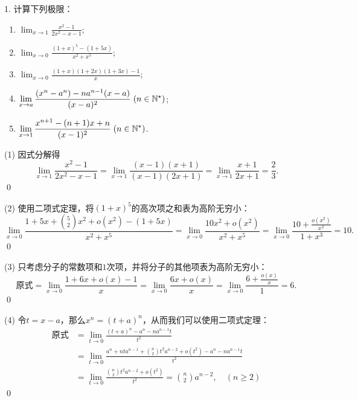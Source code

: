 \exercise

1. 计算下列极限：
\begin{enumerate}
    \item $\displaystyle\lim_{x \to 1} \displaystyle\frac{x^2-1}{2x^2-x-1}$; 
    \item $\displaystyle\lim_{x \to 0} \displaystyle\frac{(1+x)^5-(1+5x)}{x^2+x^5}$;
\end{enumerate}
\pagebreak
\begin{enumerate}
\setcounter{enumi}{2}
    \item $\displaystyle\lim_{x \to 0} \displaystyle\frac{(1+x)(1+2x)(1+3x)-1}{x}$;
    \item $\displaystyle\lim_{x \to a} \displaystyle\frac{(x^n-a^n)-na^{n-1}(x-a)}{(x-a)^2} \; (n \in \mathbb{N}^\star)$;
    \item $\displaystyle\lim_{x \to 1} \displaystyle\frac{x^{n+1}-(n+1)x+n}{(x-1)^2} \; (n\in\mathbb{N}^\star)$.
\end{enumerate}
\bigskip

(1) \solve 因式分解得
\begin{equation}
    \lim_{x \to 1} \frac{x^2-1}{2x^2-x-1} = \lim_{x \to 1} \frac{(x-1)(x+1)}{(x-1)(2x+1)} = \lim_{x \to 1} \frac{x+1}{2x+1} = \frac{2}{3}.
\end{equation}
\qed\bigskip

(2) \solve 使用二项式定理，将$(1+x)^5$的高次项之和表为高阶无穷小：
\begin{equation}
    \lim_{x \to 0} \frac{1+5x+\binom{5}{2}x^2+o(x^2)-(1+5x)}{x^2+x^5} = \lim_{x \to 0} \frac{10x^2+o(x^2)}{x^2+x^5} = \lim_{x \to 0} \frac{10+\displaystyle\frac{o(x^2)}{x^2}}{1+x^3} = 10.
\end{equation}
\qed\bigskip

(3) \solve 只考虑分子的常数项和$1$次项，并将分子的其他项表为高阶无穷小：
\begin{equation}
    \text{原式} = \lim_{x \to 0} \frac{1 + 6x + o(x) - 1}{x} = \lim_{x \to 0} \frac{6x + o(x)}{x} = \lim_{x \to 0} \frac{6 + \displaystyle\frac{o(x)}{x}}{1} = 6.
\end{equation}
\qed\bigskip

(4) \solve 令$t = x-a$，那么$x^n = (t+a)^n$，从而我们可以使用二项式定理：
\begin{align}
    \text{原式} &= \lim_{t \to 0} \frac{(t+a)^n-a^n-na^{n-1}t}{t^2} \\
    &= \lim_{t \to 0} \frac{a^n + nt a^{n-1} + \binom{n}{2}t^2 a^{n-2} + o(t^2) - a^n - na^{n-1}t}{t^2}  \\
    &= \lim_{t \to 0} \frac{\binom{n}{2}t^2 a^{n-2}+o(t^2)}{t^2}  = \binom{n}{2}a^{n-2} , \quad (n \geq 2)
\end{align}
\qed\bigskip

